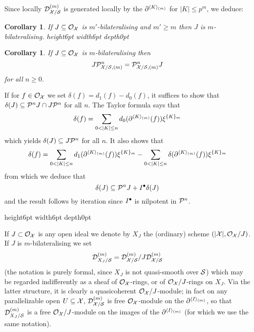 \documentclass{article}
\theoremstyle{change}
\newtheorem{cor}[subsubsection]{Corollary}
\numberwithin{equation}{subsubsection}
\newcommand{\demobox}{\vrule height6pt width6pt depth0pt}
\newcommand{\nodemo}{\unskip\nobreak\hfil\qquad
\demobox\parfillskip=0pt\par}
\newenvironment{demo}{\noindent{\it Proof.}}
{{\unskip\nobreak\hfil\qquad
\demobox\parfillskip=0pt\par}
\medskip}
\begin{document}
Since locally ${{\cal D}}^{({m})}_{{\cal X}/{\cal S}}$ is generated locally by the
${{\partial}}^{\langle{K}\rangle_{(m)}}$ for $|K|\le p^{m}$, we deduce:

\begin{cor}\label{cor:bilateralising-descends}
  If $J\subseteq{\cal O}_{\cal X}$ is $m'$-bilateralising and $m'\ge m$ then $J$ is
  $m$-bilateralising.\nodemo
\end{cor}

\begin{cor}\label{cor:bilaterals-and-envelopes}
  If $J\subseteq{\cal O}_{\cal X}$ is $m$-bilateralising then
  \begin{displaymath}
    J{\cal P}^n_{{\cal X}/{\cal S},(m)}={\cal P}^n_{{\cal X}/{\cal S},(m)}J
  \end{displaymath}
  for all $n\ge0$.
\end{cor}
\begin{demo}
  If for $f\in{\cal O}_{\cal X}$ we set $\delta(f)=d_1(f)-d_0(f)$, it suffices to
  show that $\delta(J)\subseteq{\cal P}^nJ\cap J{\cal P}^n$ for all $n$. The Taylor
  formula says that
  \begin{displaymath}
    \delta(f)=\sum_{0<|K|\le n}d_0(\dpabniv{\d}{K}{m}(f))\dpniv{\xi}{K}{m}
  \end{displaymath}
  which yields $\delta(J)\subseteq J{\cal P}^n$ for all $n$. It also
  shows that
  \begin{displaymath}
    \delta(f)=\sum_{0<|K|\le
      n}d_1(\dpabniv{\d}{K}{m}(f))\dpniv{\xi}{K}{m}
    -\sum_{0<|K|\le n}\delta(\dpabniv{\d}{K}{m}(f))\dpniv{\xi}{K}{m}
  \end{displaymath}
  from which we deduce that
  \begin{displaymath}
    \delta(J)\subseteq{\cal P}^nJ+I^\bullet\delta(J)
  \end{displaymath}
  and the result follows by iteration since $I^\bullet$ is nilpotent in
  ${\cal P}^n$. 
\end{demo}

If $J\subset{\cal O}_{\cal X}$ is any open ideal we denote by $X_J$ the
(ordinary) scheme $(|{\cal X}|,{\cal O}_{\cal X}/J)$.  If $J$ is $m$-bilateralising we
set
\begin{equation}
  \label{eq:nivD-XJ}
  {{\cal D}}^{({m})}_{X_J/{\cal S}}={{\cal D}}^{({m})}_{{\cal X}/{\cal S}}/J{{\cal D}}^{({m})}_{{\cal X}/{\cal S}}
\end{equation}
(the notation is purely formal, since $X_J$ is not quasi-smooth over
${\cal S}$) which may be regarded indifferently as a sheaf of
${\cal O}_{\cal X}$-rings, or of ${\cal O}_{\cal X}/J$-rings on $X_J$. Via the latter
structure, it is clearly a quasicoherent ${\cal O}_{\cal X}/J$-module; in fact on
any parallelizable open $U\subseteq{\cal X}$, ${{\cal D}}^{({m})}_{{\cal X}/{\cal S}}$ is free
${\cal O}_{\cal X}$-module on the ${{\partial}}^{\langle{I}\rangle_{(m)}}$, so that
${{\cal D}}^{({m})}_{X_J/{\cal S}}$ is a free ${\cal O}_{\cal X}/J$-module on the images of
the ${{\partial}}^{\langle{I}\rangle_{(m)}}$ (for which we use the same notation).
\end{document}
